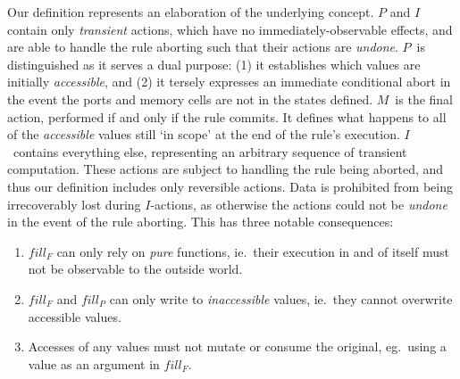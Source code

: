 Our definition represents an elaboration of the underlying concept. $P$ and $I$ contain only \textit{transient} actions, which have no immediately-observable effects, and are able to handle the rule aborting such that their actions are \textit{undone}. $P$~is distinguished as it serves a dual purpose: (1) it establishes which values are initially \textit{accessible}, and (2) it tersely expresses an immediate conditional abort in the event the ports and memory cells are not in the states defined. $M$~is the final action, performed if and only if the rule commits. It defines what happens to all of the \textit{accessible} values still `in scope' at the end of the rule's execution. $I$~contains everything else, representing an arbitrary sequence of transient computation. These actions are subject to handling the rule being aborted, and thus our definition includes only reversible actions. Data is prohibited from being irrecoverably lost during $I$-actions, as otherwise the actions could not be \textit{undone} in the event of the rule aborting. This has three notable consequences:
\begin{enumerate}
	\item $fill_F$ can only rely on \textit{pure} functions, ie.\ their execution in and of itself must not be observable to the outside world.
	\item $fill_F$ and $fill_P$ can only write to \textit{inaccessible} values, ie.\ they cannot overwrite accessible values.
	\item Accesses of any values must not mutate or consume the original, eg.\ using a value as an argument in $fill_F$.
\end{enumerate}

%
%
%
%

